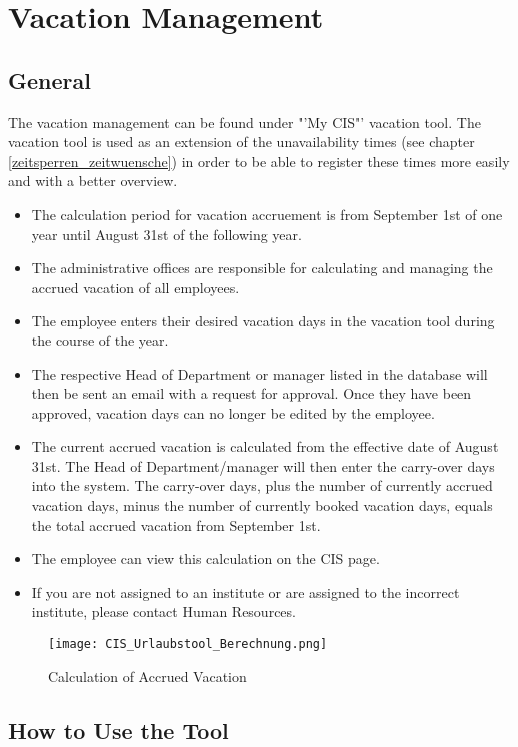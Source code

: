 \chapter{Vacation Management}
\label{urlaubsverwaltung}
\section{General}

The vacation management can be found under "'My CIS"' vacation tool.
The vacation tool is used as an extension of the unavailability times (see chapter \ref{zeitsperren_zeitwuensche}) in order to be able to register these times more easily and with a better overview.

\begin{itemize}
	\item The calculation period for vacation accruement is from September 1st of one year until August 31st of the following year.
	\item The administrative offices are responsible for calculating and managing the accrued vacation of all employees.
	\item The employee enters their desired vacation days in the vacation tool during the course of the year.
	\item The respective Head of Department or manager listed in the database will then be sent an email with a request for approval. Once they have been approved, vacation days can no longer be edited by the employee.
	\item The current accrued vacation is calculated from the effective date of August 31st. The Head of Department/manager will then enter the carry-over days into the system. The carry-over days, plus the number of currently accrued vacation days, minus the number of currently booked vacation days, equals the total accrued vacation from September 1st.
	\item The employee can view this calculation on the CIS page.
	\item If you are not assigned to an institute or are assigned to the incorrect institute, please contact Human Resources. 
\end{itemize}

\begin{figure}
	\centering
	\texttt{[image: CIS\_Urlaubstool\_Berechnung.png]}
	\caption{Calculation of Accrued Vacation}
\end{figure}

\section{How to Use the Tool}


